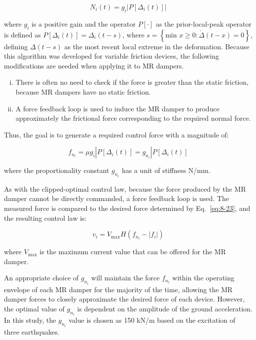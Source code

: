 \begin{equation}\label{eq:8-22}
N_{i}(t)=g_{i}|P\left[\Delta_{i}(t)\right]|
\end{equation}

where $g_{i}$ is a positive gain and the operator $P\left[\cdot\right]$ as the prior-local-peak operator is defined as $P\left[\Delta_{i}(t)\right] = \Delta_{i}(t-s)$, where $s=\left\{\text{min }x\geq 0: \dot{\Delta}\left(t-x\right)=0\right\}$, defining $\Delta\left(t-s\right)$ as the most recent local extreme in the deformation.
Because this algorithm was developed for variable friction devices, the following modifications are needed when applying it to MR dampers.

\begin{enumerate}[(i)]
\item There is often no need to check if the force is greater than the static friction, because MR dampers have no static friction.
\item A force feedback loop is used to induce the MR damper to produce approximately the frictional force corresponding to the required normal force.
\end{enumerate}
Thus, the goal is to generate a required control force with a magnitude of:

\begin{equation}\label{eq:8-23}
f_{n_{i}}=\mu g_{i}|P\left[\Delta_{i}(t)\right]=g_{n_{i}}|P\left[\Delta_{i}(t)\right]
\end{equation}

where the proportionality constant $g_{n_{i}}$ has a unit of stiffness N/mm.

As with the clipped-optimal control law, because the force produced by the MR damper cannot be directly commanded, a force feedback loop is used. The measured force is compared to the desired force determined by Eq.~\eqref{eq:8-23}, and the resulting control law is:

\begin{equation}\label{eq:8-24}
v_{i} = V_{\text{max}}H\left(f_{n_{i}}-|f_{i}|\right)
\end{equation}

where $V_{\max}$ is the maximum current value that can be offered for the MR damper.

An appropriate choice of $g_{n_{i}}$ will maintain the force $f_{n_{i}}$ within the operating envelope of each MR damper for the majority of the time, allowing the MR damper forces to closely approximate the desired force of each device. However, the optimal value of $g_{n_{i}}$ is dependent on the amplitude of the ground acceleration. In this study, the $g_{n_{i}}$ value is chosen as 150 kN/m based on the excitation of three earthquakes.

